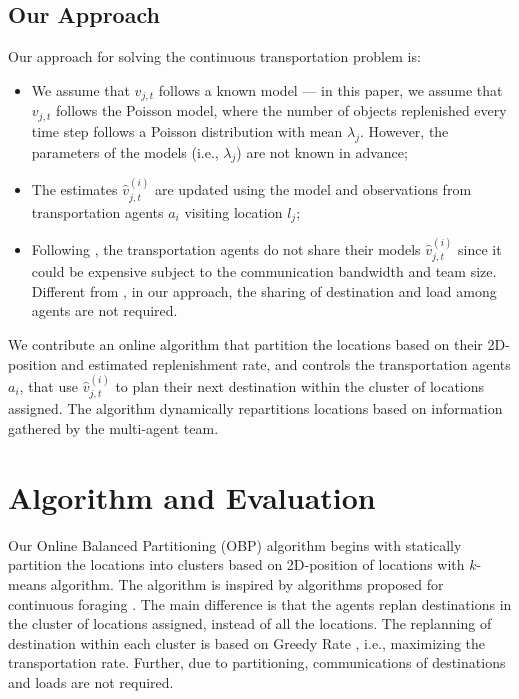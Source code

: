 \documentclass{aamas2016_extendedabstract}
\begin{document}
\subsection{Our Approach}
Our approach for solving the continuous transportation problem is:
\begin{itemize}
\itemsep0em
\item We assume that $v_{j,t}$ follows a known model --- in
this paper, we assume that $v_{j,t}$ follows the Poisson model, where the number of objects replenished every time step follows a Poisson distribution with mean $\lambda_j$. However, the parameters of the models (i.e., $\lambda_j$) are not known in advance;
\item The estimates $\hat{v}^{(i)}_{j,t}$ are updated using the model and
observations from transportation agents $a_i$ visiting location $l_j$;
\item Following \cite{liemhetcharat2015continuous}, the transportation agents do not share their models $\hat{v}^{(i)}_{j,t}$ since it could
be expensive subject to the communication bandwidth and team size.
Different from \cite{liemhetcharat2015continuous}, in our approach, the sharing of destination and load among agents are not required.
\end{itemize}
We contribute an online algorithm that partition the
locations based on their 2D-position and estimated replenishment rate, and controls the 
transportation agents $a_i$, that use $\hat{v}^{(i)}_{j,t}$ to plan
their next destination within the cluster of locations assigned. The algorithm dynamically repartitions locations based on information gathered
by the multi-agent team.

\section{Algorithm and Evaluation}
Our Online Balanced Partitioning (OBP) algorithm begins with statically
partition the locations into clusters based on 2D-position of locations with $k$-means algorithm.
The algorithm is inspired by algorithms proposed for continuous foraging
\cite{liemhetcharat2015continuous}. The main difference is
that the agents replan destinations in the cluster of locations assigned, instead of all the locations.
The replanning of destination within each cluster is based on Greedy Rate \cite{liemhetcharat2015continuous}, i.e., maximizing the transportation rate.
Further, due to partitioning, communications of destinations and loads are not required.
\end{document}
